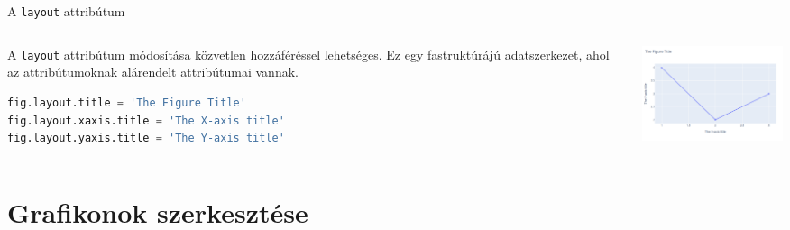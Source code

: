 \documentclass[english, aspectratio=169]{beamer}
\makeatletter
\let\origtableofcontents=\tableofcontents
\def\tableofcontents{\@ifnextchar[{\origtableofcontents}{\gobbletableofcontents}}
\def\gobbletableofcontents#1{\origtableofcontents}
\makeatother
\begin{document}
	\begin{frame}[fragile]{A \texttt{layout} attribútum}
		\begin{columns}
			\begin{column}{.5\textwidth}
				A \texttt{layout} attribútum módosítása közvetlen hozzáféréssel lehetséges. Ez egy fastruktúrájú adatszerkezet, ahol az attribútumoknak alárendelt attribútumai vannak.
				\vspace{0.3cm}
				\begin{lstlisting}[language=python]
fig.layout.title = 'The Figure Title'
fig.layout.xaxis.title = 'The X-axis title'
fig.layout.yaxis.title = 'The Y-axis title'				
				\end{lstlisting}
			\end{column}
			\begin{column}{.5\textwidth}
				\begin{center}
					\includegraphics[width=6cm, keepaspectratio]{images/plots_3.png}
				\end{center}
			\end{column}
		\end{columns}
	\end{frame}
	
	\section{Grafikonok szerkesztése}
	
	\begin{frame}{}
		\tableofcontents[currentsection]
	\end{frame}
	
\end{document}
